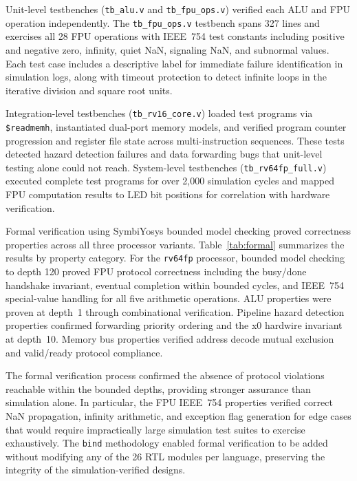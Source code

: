 \documentclass[journal]{IEEEtran}
\begin{document}
Unit-level testbenches (\texttt{tb\_alu.v} and \texttt{tb\_fpu\_ops.v})
verified each ALU and FPU operation independently.  The
\texttt{tb\_fpu\_ops.v} testbench spans 327 lines and exercises all 28
FPU operations with IEEE~754 test constants including positive and
negative zero, infinity, quiet NaN, signaling NaN, and subnormal values.
Each test case includes a descriptive label for immediate failure
identification in simulation logs, along with timeout protection to
detect infinite loops in the iterative division and square root units.

Integration-level testbenches (\texttt{tb\_rv16\_core.v}) loaded test
programs via \texttt{\$readmemh}, instantiated dual-port memory models,
and verified program counter progression and register file state across
multi-instruction sequences.  These tests detected hazard detection
failures and data forwarding bugs that unit-level testing alone could not
reach.  System-level testbenches (\texttt{tb\_rv64fp\_full.v}) executed
complete test programs for over 2,000 simulation cycles and mapped FPU
computation results to LED bit positions for correlation with hardware
verification.

Formal verification using SymbiYosys bounded model checking proved
correctness properties across all three processor variants.
Table~\ref{tab:formal} summarizes the results by property category.  For
the \texttt{rv64fp} processor, bounded model checking to depth 120
proved FPU protocol correctness including the busy/done handshake
invariant, eventual completion within bounded cycles, and IEEE~754
special-value handling for all five arithmetic operations.  ALU
properties were proven at depth~1 through combinational verification.
Pipeline hazard detection properties confirmed forwarding priority
ordering and the x0 hardwire invariant at depth~10.  Memory bus
properties verified address decode mutual exclusion and valid/ready
protocol compliance.

The formal verification process confirmed the absence of protocol
violations reachable within the bounded depths, providing stronger
assurance than simulation alone.  In particular, the FPU IEEE~754
properties verified correct NaN propagation, infinity arithmetic, and
exception flag generation for edge cases that would require impractically
large simulation test suites to exercise exhaustively.  The
\texttt{bind} methodology enabled formal verification to be added
without modifying any of the 26 RTL modules per language, preserving the
integrity of the simulation-verified designs.
\end{document}
